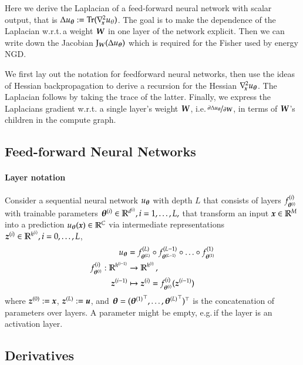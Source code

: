 Here we derive the Laplacian of a feed-forward neural network with scalar output, that is $\Delta u_{{\boldsymbol{\theta}}} := \operatorname{Tr}(\nabla_{\!{{\boldsymbol{x}}}}^{2} u_{\theta})$.
The goal is to make the dependence of the Laplacian w.r.t.\,a weight ${\boldsymbol{W}}$ in one layer of the network explicit.
Then we can write down the Jacobian $\mathrm{J}_{{\boldsymbol{W}}}(\Delta u_{{\boldsymbol{\theta}}})$ which is required for the Fisher used by energy NGD.

We first lay out the notation for feedforward neural networks, then use the ideas of Hessian backpropagation \citep[HBP,][]{dangel2020modular} to derive a recursion for the Hessian $\nabla_{\!{{\boldsymbol{x}}}}^{2}u_{{\boldsymbol{\theta}}}$.
The Laplacian follows by taking the trace of the latter.
Finally, we express the Laplacians gradient w.r.t.
a single layer's weight ${\boldsymbol{W}}$, i.e.\,$\nicefrac{\partial \Delta u_{{\boldsymbol{\theta}}}}{\partial {\boldsymbol{W}}}$, in terms of ${\boldsymbol{W}}$'s children in the compute graph.

\subsection{Feed-forward Neural Networks}
\paragraph{Layer notation} Consider a sequential neural network $u_{{\boldsymbol{\theta}}}$ with depth $L$ that consists of layers $f^{(i)}_{{\boldsymbol{\theta}}^{(i)}}$ with trainable parameters ${\boldsymbol{\theta}}^{(i)} \in {\mathbb{R}}^{d^{(i)}}, i=1,\dots, L,$ that transform an input ${\boldsymbol{x}} \in {\mathbb{R}}^M$ into a prediction $u_{{\boldsymbol{\theta}}}({\boldsymbol{x}})\in {\mathbb{R}}^C$ via intermediate representations ${\boldsymbol{z}}^{(i)} \in {\mathbb{R}}^{h^{(i)}}, i= 0, \dots, L$,
\begin{align}
  \begin{split}
    u_{{\boldsymbol{\theta}}}
    &=
      f^{(L)}_{{\boldsymbol{\theta}}^{(L)}} \circ f^{(L-1)}_{{\boldsymbol{\theta}}^{(L-1)}} \circ \ldots \circ f^{(1)}_{{\boldsymbol{\theta}}^{(1)}}
    \\
    f^{(i)}_{{\boldsymbol{\theta}}^{(i)}}: {\mathbb{R}}^{h^{(i-1)}}
    &\to
      {\mathbb{R}}^{h^{(i)}}\,,
    \\
    {\boldsymbol{z}}^{(i-1)}
    &\mapsto
      {\boldsymbol{z}}^{(i)} = f^{(i)}_{{\boldsymbol{\theta}}^{(i)}}({\boldsymbol{z}}^{(i-1)})
  \end{split}
\end{align}
where ${\boldsymbol{z}}^{(0)} := {\boldsymbol{x}}$, ${\boldsymbol{z}}^{(L)} := {\boldsymbol{u}}$, and ${\boldsymbol{\theta}} = ({{\boldsymbol{\theta}}^{(1)}}^{\top}, \dots, {{\boldsymbol{\theta}}^{(L)}}^{\top})^{\top}$ is the concatenation of parameters over layers.
A parameter might be empty, e.g.\,if the layer is an activation layer.

\subsection{Derivatives}

